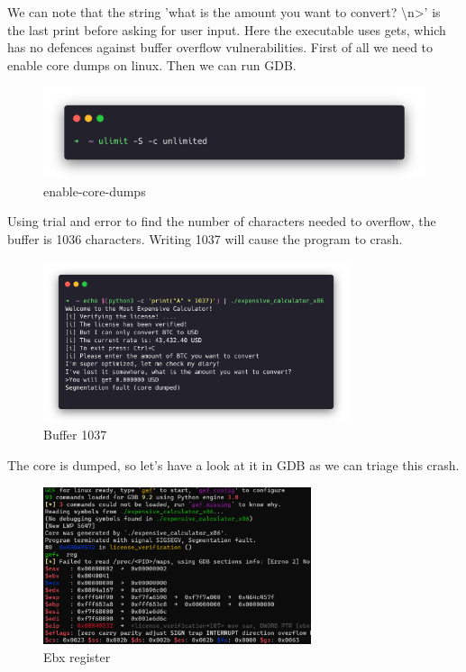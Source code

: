 We can note that the string 'what is the amount you want to convert?
\textbackslash n>' is the last print before asking for user input. Here the
executable uses gets, which has no defences against buffer overflow
vulnerabilities.
First of all we need to enable core dumps on linux. Then we can run GDB.

\begin{figure}[H] \centering
\includegraphics[width=1\textwidth]{figures/enable-core-dumps}
\caption{enable-core-dumps} \label{f:enable-core-dumps} \end{figure}

Using trial and error to find the number of characters needed to overflow, the
buffer is 1036 characters. Writing 1037 will cause the program to crash.

\begin{figure}[H]
  \centering
  \includegraphics[width=0.8\textwidth]{figures/echo-python}
  \caption{Buffer 1037}
  \label{f:echo-python}
\end{figure}

The core is dumped, so let's have a look at it in GDB as we can triage this
crash.


\begin{figure}[H]
  \centering
  \includegraphics[width=0.7\textwidth]{figures/gdb1}
  \caption{Ebx register}
  \label{f:gdb1}
\end{figure}


